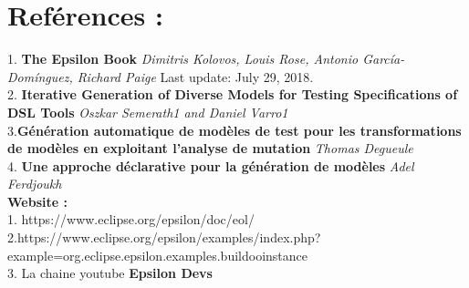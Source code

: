 \documentclass[french]{article}
\begin{document}
\newpage
\section{Reférences :}	
1. \textbf{The Epsilon Book} \linebreak
\textit{Dimitris Kolovos, Louis Rose, Antonio García-Domínguez, Richard Paige}\linebreak
Last update: July 29, 2018.\linebreak \\
2. \textbf{Iterative Generation of Diverse Models
for Testing Specifications of DSL Tools} \linebreak
\textit{Oszkar Semerath1 and Daniel Varro1}\linebreak \\
3.\textbf{Génération automatique de modèles de
test pour les transformations de modèles
en exploitant l’analyse de mutation} \linebreak
\textit{Thomas Degueule} \linebreak \\
4. \textbf{Une approche déclarative pour la génération de modèles} \linebreak
   \textit{Adel Ferdjoukh}\linebreak \\

\textbf{Website : } \linebreak \\
1. https://www.eclipse.org/epsilon/doc/eol/ \linebreak \\

2.https://www.eclipse.org/epsilon/examples/index.php?example=org.eclipse.epsilon.examples.buildooinstance \linebreak \\

3. La chaine youtube \textbf{Epsilon Devs}
\end{document}
